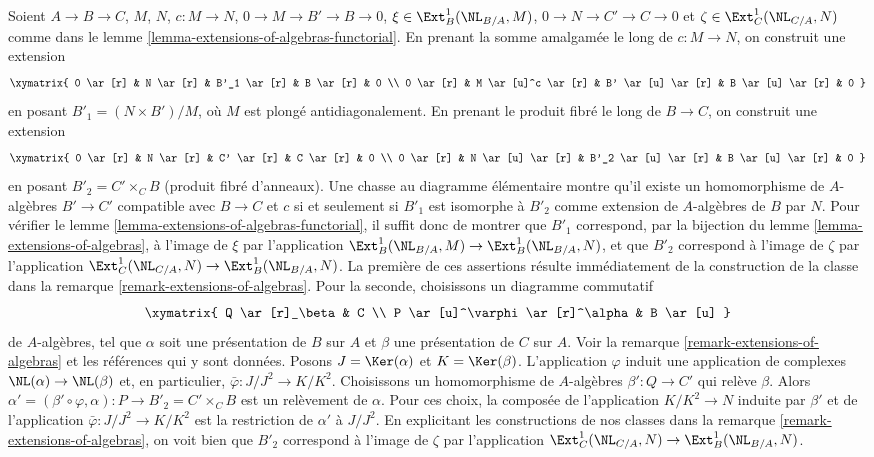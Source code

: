 \begin{remark}
\label{remark-extensions-of-algebras-functorial}
Soient $A \to B \to C$, $M$, $N$, $c : M \to N$,
$0 \to M \to B' \to B \to 0$, $\xi \in \Ext^1_B(\NL_{B/A}, M)$,
$0 \to N \to C' \to C \to 0$ et $\zeta \in \Ext^1_C(\NL_{C/A}, N)$ comme dans le
lemme \ref{lemma-extensions-of-algebras-functorial}.
En prenant la somme amalgamée le long de $c : M \to N$, on construit une extension
$$
\xymatrix{
0 \ar[r] & N \ar[r] & B'_1 \ar[r] & B \ar[r] & 0 \\
0 \ar[r] & M \ar[u]^c \ar[r] & B' \ar[u] \ar[r] & B \ar[u] \ar[r] & 0
}
$$
en posant $B'_1 = (N \times B')/M$, où $M$ est plongé
antidiagonalement. En prenant le produit fibré le long de $B \to C$, on construit une extension
$$
\xymatrix{
0 \ar[r] & N \ar[r] & C' \ar[r] & C \ar[r] & 0 \\
0 \ar[r] & N \ar[u] \ar[r] & B'_2 \ar[u] \ar[r] & B \ar[u] \ar[r] & 0
}
$$
en posant $B'_2 = C' \times_C B$ (produit fibré d'anneaux). Une chasse au diagramme élémentaire
montre qu'il existe un homomorphisme de $A$-algèbres $B' \to C'$
compatible avec $B \to C$ et $c$ si et seulement si $B'_1$ est isomorphe
à $B'_2$ comme extension de $A$-algèbres de $B$ par $N$. Pour vérifier
le lemme \ref{lemma-extensions-of-algebras-functorial},
il suffit donc de montrer que $B'_1$ correspond, par la bijection du
lemme \ref{lemma-extensions-of-algebras},
à l'image de $\xi$ par l'application
$\Ext^1_B(\NL_{B/A}, M) \to \Ext^1_B(\NL_{B/A}, N)$,
et que $B'_2$ correspond à l'image de $\zeta$ par l'application
$\Ext^1_C(\NL_{C/A}, N) \to \Ext^1_B(\NL_{B/A}, N)$.
La première de ces assertions résulte immédiatement de la construction
de la classe dans la remarque \ref{remark-extensions-of-algebras}.
Pour la seconde, choisissons un diagramme commutatif
$$
\xymatrix{
Q \ar[r]_\beta & C \\
P \ar[u]^\varphi \ar[r]^\alpha & B \ar[u]
}
$$
de $A$-algèbres, tel que $\alpha$ soit une présentation de $B$ sur $A$
et $\beta$ une présentation de $C$ sur $A$. Voir la
remarque \ref{remark-extensions-of-algebras} et les références qui y sont données.
Posons $J = \Ker(\alpha)$ et $K = \Ker(\beta)$. L'application $\varphi$
induit une application de complexes $\NL(\alpha) \to \NL(\beta)$
et, en particulier, $\bar\varphi : J/J^2 \to K/K^2$.
Choisissons un homomorphisme de $A$-algèbres $\beta' : Q \to C'$
qui relève $\beta$. Alors
$\alpha' = (\beta' \circ \varphi, \alpha) : P \to B'_2 = C' \times_C B$
est un relèvement de $\alpha$. Pour ces choix, la composée de l'application
$K/K^2 \to N$ induite par $\beta'$ et de l'application $\bar\varphi : J/J^2 \to K/K^2$
est la restriction de $\alpha'$ à $J/J^2$.
En explicitant les constructions de nos classes dans la
remarque \ref{remark-extensions-of-algebras},
on voit bien que
$B'_2$ correspond à l'image de $\zeta$ par l'application
$\Ext^1_C(\NL_{C/A}, N) \to \Ext^1_B(\NL_{B/A}, N)$.
\end{remark}

